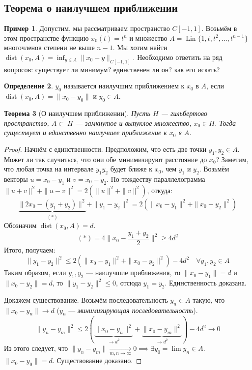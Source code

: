 \documentclass[11pt,openany,a4paper]{scrartcl}
\theoremstyle{plain}
\newtheorem{theorem}{Теорема}[subsection]
\theoremstyle{definition}
\newtheorem{definition}[theorem]{Определение}
\newtheorem{example}[theorem]{Пример}
\newcommand{\underto}[1]{\xrightarrow[#1]{}}
\DeclareMathOperator{\dist}{dist}
\DeclareMathOperator{\Lin}{Lin}
\begin{document}
\subsection{Теорема о наилучшем приближении}

\begin{example}
    Допустим, мы рассматриваем пространство $C[-1, 1]$. Возьмём в этом
    пространстве функцию $x_0(t) = t^n$ и множество
    $A = \Lin\{1, t, t^2, \ldots, t^{n-1}\}$ многочленов степени не выше $n-1$.
    Мы хотим найти $\dist(x_0, A) = \inf_{y\in A}\|x_0 - y\|_{C[-1, 1]}$. 
    Необходимо ответить на ряд вопросов: существует ли минимум? единственен ли он?
    как его искать?
\end{example}

\begin{definition}
    $y_0$ называется наилучшим приближением к $x_0$ в $A$, если
    $\dist(x_0, A) = \|x_0 - y_0\|$ и $y_0 \in A$.
\end{definition}

\begin{theorem}[О наилучшем приближении]
    Пусть $H$ — гильбертово пространство, $A \subset~H$ — замкнутое и выпуклое 
    множество, $x_0 \in H$. Тогда существует и единственно наилучшее
    приближение к $x_0$ в $A$.
\end{theorem}
\begin{proof}
    Начнём с единственности. Предположим, что есть две точки $y_1, y_2 \in A$.
    Может ли так случиться, что они обе минимизируют расстояние до $x_0$? Заметим,
    что любая точка на интервале $y_1y_2$ будет ближе к $x_0$, чем $y_1$ и $y_2$.
    Возьмём векторы $u = x_0 - y_1$ и $v = x_0 - y_2$. По тождеству 
    параллелограмма $\|u + v\|^2 + \|u - v\|^2 = 2(\|u\|^2 + \|v\|^2)$, откуда:
    $$
    \underbrace{\|2x_0 - (y_1 + y_2)\|^2}_{(\ast)} + \|y_1 - y_2\|^2 =
    2(\|x_0 - y_1\|^2 + \|x_0 - y_2\|^2)
    $$
    Обозначим $\dist(x_0, A) = d$.
    $$
    (\ast) = 4\|x_0 - \frac{y_1 + y_2}{2}\|^2 \geqslant 4d^2
    $$
    Итого, получаем:
    $$
    \|y_1 - y_2\|^2 \leqslant 2(\|x_0 - y_1\|^2 + \|x_0 - y_2\|^2) - 4d^2
    \quad \forall y_1, y_2 \in A
    $$
    Таким образом, если $y_1, y_2$ — наилучшие приближения, то $\|x_0 - y_1\| = d$
    и $\|x_0 - y_2\| = d$, то $\|y_1 - y_2\|^2 \leqslant 0$, отсюда $y_1 = y_2$.
    Единственность доказана.
    
    Докажем существование. Возьмём последовательность $y_n \in A$ такую, что
    $\|x_0 - y_n\| \to d$ ($y_n$ — \emph{минимизирующая последовательность}).
    $$
    \|y_n - y_m\|^2 \leqslant 2(\underbrace{\|x_0 - y_n\|^2}_{\to d^2} +
    \underbrace{\|x_0 - y_m\|^2}_{\to d^2}) - 4d^2 \to 0
    $$
    Из этого следует, что $\|y_n - y_m\| \underto{m,n \to \infty} 0 \implies
    \exists y_0 = \lim y_n \in A$. $\|x_0 - y_0\| = d$. Существование доказано.
\end{proof}
\end{document}
